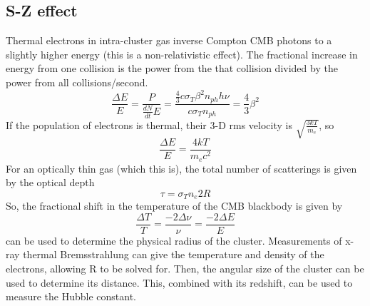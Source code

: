 \subsection{S-Z effect}
Thermal electrons in intra-cluster gas inverse Compton CMB photons to a slightly higher energy 
(this is a non-relativistic effect).  The fractional increase in energy from one collision is 
the power from the that collision divided by the power from all collisions/second.
\begin{displaymath}\frac{\Delta{E}}{E}=\frac{P}{\frac{dN}{dt}E}=\frac{\frac{4}{3}c\sigma_T\beta^2n_{ph}h\nu}{c\sigma_Tn_{ph}}=\frac{4}{3}\beta^2\end{displaymath}
If the population of electrons is thermal, their 3-D rms velocity is $\sqrt{\frac{3kT}{m_e}}$, so
\begin{displaymath}\frac{\Delta{E}}{E}=\frac{4kT}{m_ec^2}\end{displaymath}
For an optically thin gas (which this is), the total number of scatterings is given by the 
optical depth
\begin{displaymath}\tau=\sigma_Tn_e2R\end{displaymath}
So, the fractional shift in the temperature of the CMB blackbody is given by
\begin{displaymath}\frac{\Delta T}{T}=\frac{-2\Delta\nu}{\nu}=\frac{-2\Delta E}{E}\end{displaymath}
can be used to determine the physical radius of the cluster.  Measurements of x-ray thermal 
Bremsstrahlung can give the temperature and density of the electrons, allowing R to be solved for.
Then, the angular size of the cluster can be used to determine its distance.  This, combined with 
its redshift, can be used to measure the Hubble constant.

